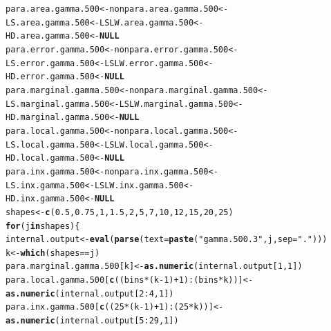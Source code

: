 \documentclass[11pt]{article}\usepackage[]{graphicx}\usepackage[]{color}
\makeatletter
\newcommand{\hlnum}[1]{\textcolor[rgb]{0.686,0.059,0.569}{#1}}%
\newcommand{\hlstr}[1]{\textcolor[rgb]{0.192,0.494,0.8}{#1}}%
\newcommand{\hlopt}[1]{\textcolor[rgb]{0,0,0}{#1}}%
\newcommand{\hlstd}[1]{\textcolor[rgb]{0.345,0.345,0.345}{#1}}%
\newcommand{\hlkwa}[1]{\textcolor[rgb]{0.161,0.373,0.58}{\textbf{#1}}}%
\newcommand{\hlkwb}[1]{\textcolor[rgb]{0.69,0.353,0.396}{#1}}%
\newcommand{\hlkwc}[1]{\textcolor[rgb]{0.333,0.667,0.333}{#1}}%
\newcommand{\hlkwd}[1]{\textcolor[rgb]{0.737,0.353,0.396}{\textbf{#1}}}%
\newenvironment{kframe}{%
 \def\at@end@of@kframe{}%
 \ifinner\ifhmode%
  \def\at@end@of@kframe{\end{minipage}}%
  \begin{minipage}{\columnwidth}%
 \fi\fi%
 \def\FrameCommand##1{\hskip\@totalleftmargin \hskip-\fboxsep
 \colorbox{shadecolor}{##1}\hskip-\fboxsep
     \hskip-\linewidth \hskip-\@totalleftmargin \hskip\columnwidth}%
 \MakeFramed {\advance\hsize-\width
   \@totalleftmargin\z@ \linewidth\hsize
   \@setminipage}}%
 {\par\unskip\endMakeFramed%
 \at@end@of@kframe}
\newenvironment{knitrout}{}{} %
\makeatother
\begin{document}
\begin{knitrout}
\color{fgcolor}\begin{kframe}
\begin{alltt}
\hlstd{para.area.gamma.500} \hlkwb{<-} \hlstd{nonpara.area.gamma.500} \hlkwb{<-}
  \hlstd{LS.area.gamma.500} \hlkwb{<-} \hlstd{LSLW.area.gamma.500} \hlkwb{<-}
  \hlstd{HD.area.gamma.500} \hlkwb{<-} \hlkwa{NULL}
\hlstd{para.error.gamma.500} \hlkwb{<-} \hlstd{nonpara.error.gamma.500} \hlkwb{<-}
  \hlstd{LS.error.gamma.500} \hlkwb{<-} \hlstd{LSLW.error.gamma.500} \hlkwb{<-}
  \hlstd{HD.error.gamma.500} \hlkwb{<-} \hlkwa{NULL}
\hlstd{para.marginal.gamma.500} \hlkwb{<-} \hlstd{nonpara.marginal.gamma.500} \hlkwb{<-}
  \hlstd{LS.marginal.gamma.500} \hlkwb{<-} \hlstd{LSLW.marginal.gamma.500} \hlkwb{<-}
  \hlstd{HD.marginal.gamma.500} \hlkwb{<-} \hlkwa{NULL}
\hlstd{para.local.gamma.500} \hlkwb{<-} \hlstd{nonpara.local.gamma.500} \hlkwb{<-}
  \hlstd{LS.local.gamma.500} \hlkwb{<-} \hlstd{LSLW.local.gamma.500} \hlkwb{<-}
  \hlstd{HD.local.gamma.500} \hlkwb{<-} \hlkwa{NULL}
\hlstd{para.inx.gamma.500} \hlkwb{<-} \hlstd{nonpara.inx.gamma.500} \hlkwb{<-}
  \hlstd{LS.inx.gamma.500} \hlkwb{<-} \hlstd{LSLW.inx.gamma.500} \hlkwb{<-}
  \hlstd{HD.inx.gamma.500} \hlkwb{<-} \hlkwa{NULL}
\hlstd{shapes} \hlkwb{<-} \hlkwd{c}\hlstd{(}\hlnum{0.5}\hlstd{,} \hlnum{0.75}\hlstd{,} \hlnum{1}\hlstd{,} \hlnum{1.5}\hlstd{,} \hlnum{2}\hlstd{,} \hlnum{5}\hlstd{,} \hlnum{7}\hlstd{,} \hlnum{10}\hlstd{,} \hlnum{12}\hlstd{,} \hlnum{15}\hlstd{,} \hlnum{20}\hlstd{,} \hlnum{25}\hlstd{)}
\hlkwa{for}\hlstd{(j} \hlkwa{in} \hlstd{shapes )\{}
  \hlstd{internal.output} \hlkwb{<-} \hlkwd{eval}\hlstd{(}\hlkwd{parse}\hlstd{(}\hlkwc{text}\hlstd{=}\hlkwd{paste}\hlstd{(}\hlstr{"gamma.500.3"}\hlstd{, j,} \hlkwc{sep} \hlstd{=} \hlstr{"."}\hlstd{)))}
  \hlstd{k} \hlkwb{<-} \hlkwd{which}\hlstd{(shapes} \hlopt{==} \hlstd{j)}
  \hlstd{para.marginal.gamma.500[k]} \hlkwb{<-} \hlkwd{as.numeric}\hlstd{(internal.output[}\hlnum{1}\hlstd{,} \hlnum{1}\hlstd{])}
  \hlstd{para.local.gamma.500[}\hlkwd{c}\hlstd{((bins}\hlopt{*}\hlstd{(k}\hlopt{-}\hlnum{1}\hlstd{)}\hlopt{+}\hlnum{1}\hlstd{)}\hlopt{:}\hlstd{(bins}\hlopt{*}\hlstd{k))]} \hlkwb{<-}
    \hlkwd{as.numeric}\hlstd{(internal.output[}\hlnum{2}\hlopt{:}\hlnum{4}\hlstd{,} \hlnum{1}\hlstd{])}
  \hlstd{para.inx.gamma.500[}\hlkwd{c}\hlstd{((}\hlnum{25}\hlopt{*}\hlstd{(k}\hlopt{-}\hlnum{1}\hlstd{)}\hlopt{+}\hlnum{1}\hlstd{)}\hlopt{:}\hlstd{(}\hlnum{25}\hlopt{*}\hlstd{k))]} \hlkwb{<-}
    \hlkwd{as.numeric}\hlstd{(internal.output[}\hlnum{5}\hlopt{:}\hlnum{29}\hlstd{,} \hlnum{1}\hlstd{])}

\end{alltt}
\end{kframe}
\end{knitrout}
\end{document}
